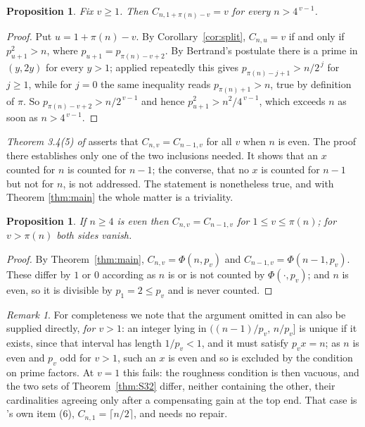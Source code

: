 \documentclass[a4paper,11pt,oneside,reqno]{amsart}
\theoremstyle{definition}
\theoremstyle{remark}
\newtheorem{remark}[definition]{Remark}
\theoremstyle{plain}
\newtheorem{proposition}[definition]{Proposition}
\begin{document}
\begin{proposition}\label{prop:fixed344}
  Fix \(v \ge 1\). Then \(C_{n,1+\pi(n)-v} = v\) for every \(n > 4^{\,v-1}\).
\end{proposition}

\begin{proof}
  Put \(u = 1+\pi(n)-v\). By Corollary~\ref{cor:split}, \(C_{n,u} = v\) if and only
  if \(p_{u+1}^{2} > n\), where \(p_{u+1} = p_{\pi(n)-v+2}\). By Bertrand's postulate
  there is a prime in \((y,2y)\) for every \(y > 1\); applied repeatedly this
  gives \(p_{\pi(n)-j+1} > n/2^{\,j}\) for \(j \ge 1\), while for \(j = 0\) the same
  inequality reads \(p_{\pi(n)+1} > n\), true by definition of \(\pi\). So
  \(p_{\pi(n)-v+2} > n/2^{\,v-1}\) and hence \(p_{u+1}^{2} > n^{2}/4^{\,v-1}\), which
  exceeds \(n\) as soon as \(n > 4^{\,v-1}\).
\end{proof}

\emph{Theorem 3.4(5) of \cite{Snellman2000}} asserts that \(C_{n,v} = C_{n-1,v}\)
for all \(v\) when \(n\) is even. The proof there establishes only one of the two
inclusions needed. It shows that an \(x\) counted for \(n\) is counted for
\(n-1\); the converse, that no \(x\) is counted for \(n-1\) but not for \(n\),
is not addressed. The statement is nonetheless true, and with Theorem
\ref{thm:main} the whole matter is a triviality.

\begin{proposition}\label{prop:fixed345}
  If \(n \ge 4\) is even then \(C_{n,v} = C_{n-1,v}\) for \(1 \le v \le \pi(n)\); for
  \(v > \pi(n)\) both sides vanish.
\end{proposition}

\begin{proof}
  By Theorem~\ref{thm:main}, \(C_{n,v} = \Phi(n,p_v)\) and
  \(C_{n-1,v} = \Phi(n-1,p_v)\). These differ by \(1\) or \(0\) according as
  \(n\) is or is not counted by \(\Phi(\cdot,p_v)\); and \(n\) is even, so it
  is divisible by \(p_1 = 2 \le p_v\) and is never counted.
\end{proof}

\begin{remark}
  For completeness we note that the argument omitted in \cite{Snellman2000} can
  also be supplied directly, \emph{for \(v > 1\)}: an integer lying in
  \(((n-1)/p_v,\,n/p_v]\) is unique if it exists, since that interval has length
  \(1/p_v < 1\), and it must satisfy \(p_vx = n\); as \(n\) is even and \(p_v\) odd
  for \(v > 1\), such an \(x\) is even and so is excluded by the condition on
  prime factors. At \(v = 1\) this fails: the roughness condition is then vacuous,
  and the two sets of Theorem~\ref{thm:S32} differ, neither containing
  the other, their cardinalities agreeing only after a compensating gain at the
  top end. That case is \cite{Snellman2000}'s own item (6),
  \(C_{n,1} = \lceil n/2\rceil\), and needs no repair.
\end{remark}
\end{document}
